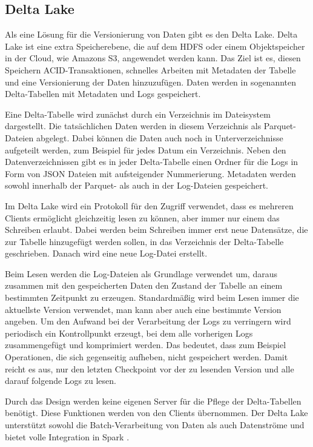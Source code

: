 \subsection{Delta Lake}

Als eine Lösung für die Versionierung von Daten gibt es den Delta Lake.
Delta Lake ist eine extra Speicherebene, die auf dem HDFS oder einem Objektspeicher in der Cloud, wie Amazons S3, angewendet werden kann.
Das Ziel ist es, diesen Speichern ACID-Transaktionen, schnelles Arbeiten mit Metadaten der Tabelle und eine Versionierung der Daten hinzuzufügen.
Daten werden in sogenannten Delta-Tabellen mit Metadaten und Logs gespeichert.

Eine Delta-Tabelle wird zunächst durch ein Verzeichnis im Dateisystem dargestellt.
Die tatsächlichen Daten werden in diesem Verzeichnis als Parquet-Dateien abgelegt.
Dabei können die Daten auch noch in Unterverzeichnisse aufgeteilt werden, zum Beispiel für jedes Datum ein Verzeichnis.
Neben den Datenverzeichnissen gibt es in jeder Delta-Tabelle einen Ordner für die Logs in Form von JSON Dateien mit aufsteigender Nummerierung.
Metadaten werden sowohl innerhalb der Parquet- als auch in der Log-Dateien gespeichert.

Im Delta Lake wird ein Protokoll für den Zugriff verwendet, dass es mehreren Clients ermöglicht gleichzeitig lesen zu können, aber immer nur einem das Schreiben erlaubt.
Dabei werden beim Schreiben immer erst neue Datensätze, die zur Tabelle hinzugefügt werden sollen, in das Verzeichnis der Delta-Tabelle geschrieben.
Danach wird eine neue Log-Datei erstellt.

Beim Lesen werden die Log-Dateien als Grundlage verwendet um, daraus zusammen mit den gespeicherten Daten den Zustand der Tabelle an einem bestimmten Zeitpunkt zu erzeugen.
Standardmäßig wird beim Lesen immer die aktuellste Version verwendet, man kann aber auch eine bestimmte Version angeben.
Um den Aufwand bei der Verarbeitung der Logs zu verringern wird periodisch ein Kontrollpunkt erzeugt, bei dem alle vorherigen Logs zusammengefügt und komprimiert werden.
Das bedeutet, dass zum Beispiel Operationen, die sich gegenseitig aufheben, nicht gespeichert werden.
Damit reicht es aus, nur den letzten Checkpoint vor der zu lesenden Version und alle darauf folgende Logs zu lesen.

Durch das Design werden keine eigenen Server für die Pflege der Delta-Tabellen benötigt.
Diese Funktionen werden von den Clients übernommen.
Der Delta Lake unterstützt sowohl die Batch-Verarbeitung von Daten als auch Datenströme und bietet volle Integration in Spark \parencite{deltalake}.

